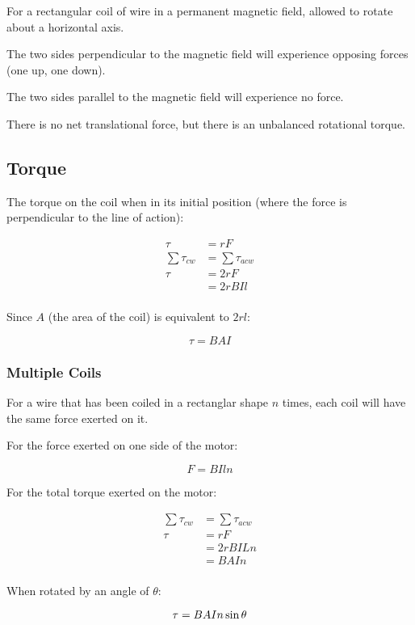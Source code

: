 \documentclass[a4paper,11pt]{article}
\begin{document}
For a rectangular coil of wire in a permanent magnetic field, allowed to rotate
about a horizontal axis.

The two sides perpendicular to the magnetic field will experience opposing
forces (one up, one down).

The two sides parallel to the magnetic field will experience no force.

There is no net translational force, but there is an unbalanced rotational
torque.


\subsection{Torque}

The torque on the coil when in its initial position (where the force is
perpendicular to the line of action):

$$
\begin{aligned}
\tau & = rF \\
\sum \tau_{cw} & = \sum \tau_{acw} \\
\tau & = 2rF \\
& = 2rBIl \\
\end{aligned}
$$

Since $A$ (the area of the coil) is equivalent to $2rl$:

$$
\tau = BAI
$$


\subsubsection{Multiple Coils}

For a wire that has been coiled in a rectanglar shape $n$ times, each coil will
have the same force exerted on it.

For the force exerted on one side of the motor:

$$
F = BIln
$$

For the total torque exerted on the motor:

$$
\begin{aligned}
\sum \tau_{cw} & = \sum \tau_{acw} \\
\tau & = rF \\
& = 2r BILn \\
& = BAIn \\
\end{aligned}
$$

When rotated by an angle of $\theta$:

$$
\tau = BAIn \sin{\theta} \\
$$
\end{document}
